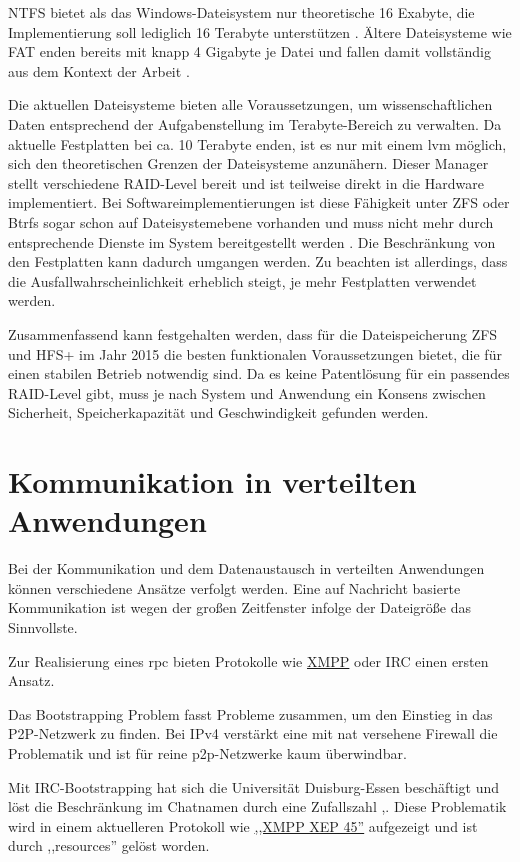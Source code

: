 \documentclass[oneside, ngerman, toc=bibliography,bibliography=totoc,listof=entryprefix, open=right,numbers=noenddot,fontsize=12pt]{scrbook}
\begin{document}
NTFS bietet als das Windows-Dateisystem nur theoretische 16 Exabyte, die Implementierung soll lediglich 16 Terabyte unterstützen \cite{ntfslimit}. Ältere Dateisysteme wie {FAT} enden bereits mit knapp 4 Gigabyte je Datei und fallen damit vollständig aus dem Kontext der Arbeit \cite{fatlimit}.
 
Die aktuellen Dateisysteme bieten alle Voraussetzungen, um wissenschaftlichen Daten entsprechend der Aufgabenstellung im Terabyte-Bereich zu verwalten. Da aktuelle Festplatten bei ca. 10 Terabyte enden, ist es nur mit einem \acrfull{lvm} möglich, sich den theoretischen Grenzen der Dateisysteme anzunähern. Dieser Manager stellt verschiedene RAID-Level bereit und ist teilweise direkt in die Hardware implementiert. Bei Softwareimplementierungen ist diese Fähigkeit unter {ZFS} oder {Btrfs} sogar schon auf Dateisystemebene vorhanden und muss nicht mehr durch entsprechende Dienste im System bereitgestellt werden \cite{zfsraid}.
Die Beschränkung von den Festplatten kann dadurch umgangen werden.
Zu beachten ist allerdings, dass die Ausfallwahrscheinlichkeit erheblich steigt, je mehr Festplatten verwendet werden.

Zusammenfassend kann festgehalten werden, dass für die Dateispeicherung {ZFS} und {HFS+} im Jahr 2015 die besten funktionalen Voraussetzungen bietet, die für einen stabilen Betrieb notwendig sind. Da es keine Patentlösung für ein passendes RAID-Level gibt, muss je nach System und Anwendung ein Konsens zwischen Sicherheit, Speicherkapazität und Geschwindigkeit gefunden werden.


\section{Kommunikation in verteilten Anwendungen}\label{sec:comm}
Bei der Kommunikation und  dem Datenaustausch in verteilten Anwendungen können verschiedene Ansätze verfolgt werden. Eine auf Nachricht basierte Kommunikation ist wegen der großen Zeitfenster infolge der Dateigröße das Sinnvollste.

Zur Realisierung eines \acrfull{rpc} bieten Protokolle wie \href{http://xmpp.org/}{XMPP}  oder IRC einen ersten Ansatz.

Das Bootstrapping Problem fasst Probleme zusammen, um den Einstieg in das P2P-Netzwerk zu finden. Bei IPv4 verstärkt eine mit \acrfull{nat} versehene Firewall die Problematik und ist für reine \acrshort{p2p}-Netzwerke kaum überwindbar.

Mit IRC-Bootstrapping hat sich die Universität Duisburg-Essen beschäftigt und löst die Beschränkung im Chatnamen durch eine Zufallszahl \cite{5159226},\cite{RFC2812}. Diese Problematik wird in einem aktuelleren Protokoll wie \href{http://xmpp.org/extensions/xep-0045.html\#enter-conflict}{,,XMPP XEP 45''} aufgezeigt und ist durch ,,resources'' gelöst worden.
\end{document}
